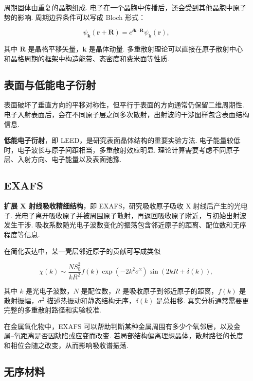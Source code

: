 \documentclass[UTF8,11pt,a4paper,openany]{ctexbook}
\newcommand{\term}[1]{\textbf{#1}}
\begin{document}
周期固体由重复的晶胞组成. 电子在一个晶胞中传播后，还会受到其他晶胞中原子势的影响. 周期边界条件可以写成 Bloch 形式：

\[
\psi_{\mathbf k}(\mathbf r+\mathbf R)
=
e^{\ii\mathbf k\cdot\mathbf R}
\psi_{\mathbf k}(\mathbf r),
\]

其中 $\mathbf R$ 是晶格平移矢量，$\mathbf k$ 是晶体动量. 多重散射理论可以直接在原子散射中心和晶格周期的框架中构造能带、态密度和费米面等性质. 

\subsection{表面与低能电子衍射}

表面破坏了垂直方向的平移对称性，但平行于表面的方向通常仍保留二维周期性. 电子入射表面后，会在不同原子层之间多次散射，出射波的干涉图样包含表面结构信息. 

\term{低能电子衍射}，即 LEED，是研究表面晶体结构的重要实验方法. 电子能量较低时，电子波长与原子间距相当，多重散射效应明显. 理论计算需要考虑不同原子层、入射方向、电子能量以及表面弛豫. 

\subsection{EXAFS}

\term{扩展 X 射线吸收精细结构}，即 EXAFS，研究吸收原子吸收 X 射线后产生的光电子. 光电子离开吸收原子并被周围原子散射，再返回吸收原子附近，与初始出射波发生干涉. 吸收系数随光电子波数变化的振荡包含邻近原子的距离、配位数和无序程度等信息. 

在简化表达中，某一壳层邻近原子的贡献可写成类似

\[
\chi(k)
\sim
\frac{N S_0^2}{kR^2}
f(k)
\exp(-2k^2\sigma^2)
\sin\left(2kR+\delta(k)\right),
\]

其中 $k$ 是光电子波数，$N$ 是配位数，$R$ 是吸收原子到邻近原子的距离，$f(k)$ 是散射振幅，$\sigma^2$ 描述热振动和静态结构无序，$\delta(k)$ 是总相移. 真实分析通常需要更完整的多重散射路径和实验校准. 

\begin{examplebox}
在金属氧化物中，EXAFS 可以帮助判断某种金属周围有多少个氧邻居，以及金属--氧距离是否因缺陷或应变而改变. 若局部结构偏离理想晶体，散射路径的长度和相位会随之改变，从而影响吸收谱振荡. 
\end{examplebox}

\subsection{无序材料}
\end{document}
